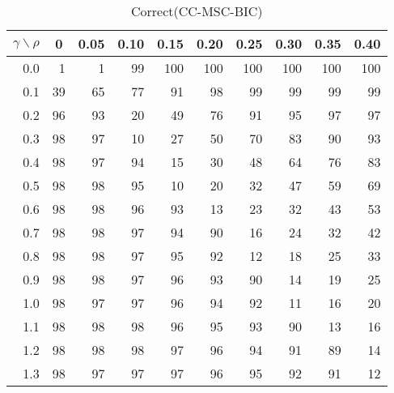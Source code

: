 \documentclass[12pt]{article}
\begin{document}
%


\begin{table}[!tbp]
\caption{Correct(CC-MSC-BIC)}
 \begin{center}
 \begin{tabular}{r|rrrrrrrrr}\hline\hline
\multicolumn{1}{c|}{$\gamma\backslash\rho$}&\multicolumn{1}{c}{0}&\multicolumn{1}{c}{0.05}&\multicolumn{1}{c}{0.10}&\multicolumn{1}{c}{0.15}&\multicolumn{1}{c}{0.20}&\multicolumn{1}{c}{0.25}&\multicolumn{1}{c}{0.30}&\multicolumn{1}{c}{0.35}&\multicolumn{1}{c}{0.40}\tabularnewline
\hline




0.0& 1& 1&99&100&100&100&100&100&100\tabularnewline
0.1&39&65&77& 91& 98& 99& 99& 99& 99\tabularnewline
0.2&96&93&20& 49& 76& 91& 95& 97& 97\tabularnewline
0.3&98&97&10& 27& 50& 70& 83& 90& 93\tabularnewline
0.4&98&97&94& 15& 30& 48& 64& 76& 83\tabularnewline
0.5&98&98&95& 10& 20& 32& 47& 59& 69\tabularnewline
0.6&98&98&96& 93& 13& 23& 32& 43& 53\tabularnewline
0.7&98&98&97& 94& 90& 16& 24& 32& 42\tabularnewline
0.8&98&98&97& 95& 92& 12& 18& 25& 33\tabularnewline
0.9&98&98&97& 96& 93& 90& 14& 19& 25\tabularnewline
1.0&98&97&97& 96& 94& 92& 11& 16& 20\tabularnewline
1.1&98&98&98& 96& 95& 93& 90& 13& 16\tabularnewline
1.2&98&98&98& 97& 96& 94& 91& 89& 14\tabularnewline
1.3&98&97&97& 97& 96& 95& 92& 91& 12\tabularnewline
\hline
\end{tabular}

\end{center}

\end{table}

%
\end{document}
